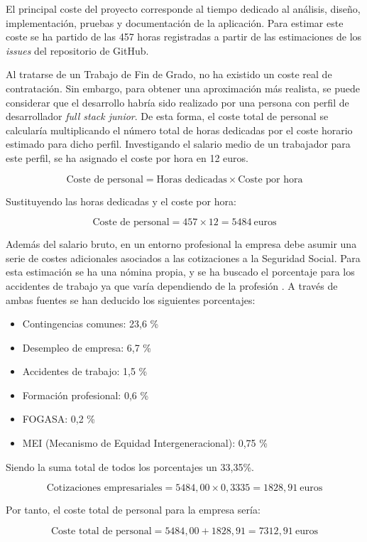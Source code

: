 El principal coste del proyecto corresponde al tiempo dedicado al análisis, diseño, implementación, pruebas y documentación de la aplicación. Para estimar este coste se ha partido de las 457 horas registradas a partir de las estimaciones de los \textit{issues} del repositorio de GitHub.

Al tratarse de un Trabajo de Fin de Grado, no ha existido un coste real de contratación. Sin embargo, para obtener una aproximación más realista, se puede considerar que el desarrollo habría sido realizado por una persona con perfil de desarrollador \textit{full stack junior}. De esta forma, el coste total de personal se calcularía multiplicando el número total de horas dedicadas por el coste horario estimado para dicho perfil. Investigando el salario medio de un trabajador para este perfil, se ha asignado el coste por hora en 12 euros.

\[
\text{Coste de personal} = \text{Horas dedicadas} \times \text{Coste por hora}
\]

Sustituyendo las horas dedicadas y el coste por hora:

\[
\text{Coste de personal} = 457 \times 12 = 5484\ \text{euros}
\]

Además del salario bruto, en un entorno profesional la empresa debe asumir una serie de costes adicionales asociados a las cotizaciones a la Seguridad Social. Para esta estimación se ha una nómina propia, y se ha buscado el porcentaje para los accidentes de trabajo ya que varía dependiendo de la profesión \cite{accidentesTrabajo}. A través de ambas fuentes se han deducido los siguientes porcentajes:
\begin{itemize}
	\item Contingencias comunes: 23,6 \%
	\item Desempleo de empresa: 6,7 \%
	\item Accidentes de trabajo: 1,5 \%
	\item Formación profesional: 0,6 \%
	\item FOGASA: 0,2 \%
	\item MEI (Mecanismo de Equidad Intergeneracional): 0,75 \%
\end{itemize}
Siendo la suma total de todos los porcentajes un 33,35\%.

\[
\text{Cotizaciones empresariales} = 5484,00 \times 0,3335 = 1828,91\ \text{euros}
\]

Por tanto, el coste total de personal para la empresa sería:

\[
\text{Coste total de personal} = 5484,00 + 1828,91 = 7312,91\ \text{euros}
\]

